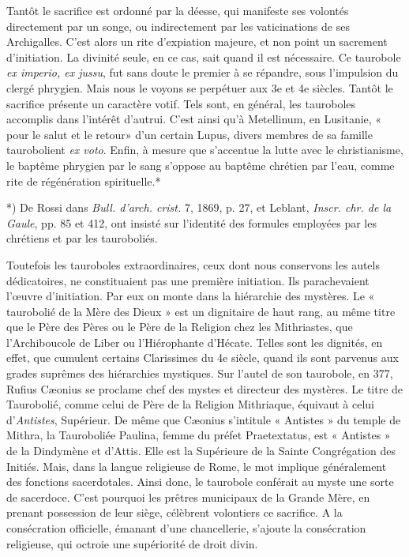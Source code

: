 \documentclass[a4paper, 11pt, oneside, polutonikogreek, french]{article}
\begin{document}
Tantôt le sacrifice est ordonné par la déesse, qui manifeste ses volontés directement par un songe, ou indirectement par les vaticinations de ses Archigalles. C'est alors un rite d'expiation majeure, et non point un sacrement d'initiation. La divinité seule, en ce cas, sait quand il est nécessaire. Ce taurobole \emph{ex imperio, ex jussu}, fut sans doute le premier à se répandre, sous l'impulsion du clergé phrygien. Mais nous le voyons se perpétuer aux 3e et 4e siècles. Tantôt le sacrifice présente un caractère votif. Tels sont, en général, les tauroboles accomplis dans l'intérêt d'autrui. C'est ainsi qu'à Metellinum, en Lusitanie, « pour le salut et le retour» d'un certain Lupus, divers membres de sa famille taurobolient \emph{ex voto}. Enfin, à mesure que s'accentue la lutte avec le christianisme, le baptême phrygien par le sang s'oppose au baptême chrétien par l'eau, comme rite de régénération spirituelle.*

*) De Rossi dans \emph{Bull. d'arch. crist.} 7, 1869, p. 27, et Leblant, \emph{Inscr. chr. de la Gaule}, pp. 85 et 412, ont insisté sur l'identité des formules employées par les chrétiens et par les tauroboliés.

Toutefois les tauroboles extraordinaires, ceux dont nous conservons les autels dédicatoires, ne constituaient pas une première initiation. Ils parachevaient l'œuvre d'initiation. Par eux on monte dans la hiérarchie des mystères. Le « taurobolié de la Mère des Dieux » est un dignitaire de haut rang, au même titre que le Père des Pères ou le Père de la Religion chez les Mithriastes, que l'Archiboucole de Liber ou l'Hiérophante d'Hécate. Telles sont les dignités, en effet, que cumulent certains Clarissimes du 4e siècle, quand ils sont parvenus aux grades suprêmes des hiérarchies mystiques. Sur l'autel de son taurobole, en 377, Rufius Cæonius se proclame chef des mystes et directeur des mystères. Le titre de Taurobolié, comme celui de Père de la Religion Mithriaque, équivaut à celui d'\emph{Antistes}, Supérieur. De même que Cæonius s'intitule « Antistes » du temple de Mithra, la Tauroboliée Paulina, femme du préfet Praetextatus, est « Antistes » de la Dindymène et d'Attis. Elle est la Supérieure de la Sainte Congrégation des Initiés. Mais, dans la langue religieuse de Rome, le mot implique généralement des fonctions sacerdotales. Ainsi donc, le taurobole conférait au myste une sorte de sacerdoce. C'est pourquoi les prêtres municipaux de la Grande Mère, en prenant possession de leur siège, célèbrent volontiers ce sacrifice. A la consécration officielle, émanant d'une chancellerie, s'ajoute la consécration religieuse, qui octroie une supériorité de droit divin.
\end{document}
